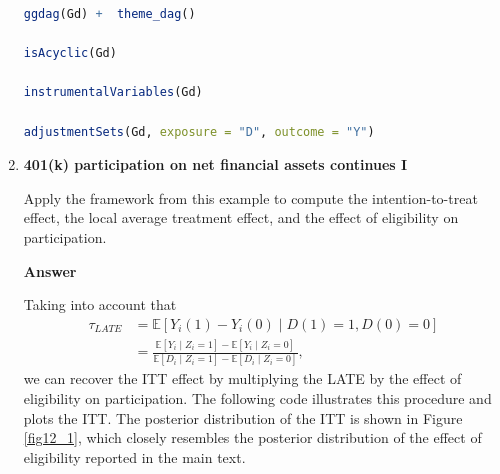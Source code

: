 \begin{enumerate}[leftmargin=*]
\begin{tcolorbox}[enhanced,width=4.67in,center upper,
	fontupper=\large\bfseries,drop shadow southwest,sharp corners]
\begin{VF}
\begin{lstlisting}[language=R]
ggdag(Gd) +  theme_dag()

isAcyclic(Gd)

instrumentalVariables(Gd)

adjustmentSets(Gd, exposure = "D", outcome = "Y")
\end{lstlisting}
	\end{VF}
\end{tcolorbox}


\item \textbf{401(k) participation on net financial assets continues I}  

Apply the framework from this example to compute the intention-to-treat effect, the local average treatment effect, and the effect of eligibility on participation.

\textbf{Answer}

Taking into account that
\begin{align*}
	\tau_{LATE} &= \mathbb{E}[Y_i(1)-Y_i(0)\mid D(1)=1, D(0)=0] \\
	&= \frac{\mathbb{E}[Y_i \mid Z_i=1] - \mathbb{E}[Y_i \mid Z_i=0]}{\mathbb{E}[D_i \mid Z_i=1] - \mathbb{E}[D_i \mid Z_i=0]},
\end{align*}
we can recover the ITT effect by multiplying the LATE by the effect of eligibility on participation. The following code illustrates this procedure and plots the ITT. The posterior distribution of the ITT is shown in Figure \ref{fig12_1}, which closely resembles the posterior distribution of the effect of eligibility reported in the main text.


\end{enumerate}
